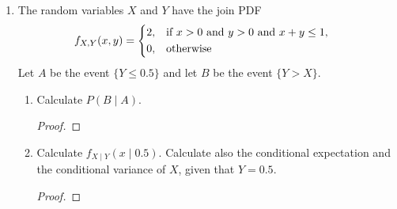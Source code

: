 \documentclass[paper=usletter, fontsize=12pt]{article}
\begin{document}
\begin{enumerate}
\begin{enumerate}
\begin{proof}
            \end{proof}

            \item On a given day your driving time was 45 minutes. What is the
            probability that this particular day was rainy?
            \begin{proof}

                \begin{align*}
                    P(\text{rainy} \mid X=45) & = \frac{P(\text{rainy})f(X=45 \mid \text{rainy})}{f(X=45)}\\
                    & = \frac{\frac{1}{3}\times\frac{1}{20}}{\frac{2}{45}+\frac{1}{60}} \\
                    & = \frac{3}{11} \qedhere
                \end{align*}

            \end{proof}

            \item Your distance to work is 20 miles. What is the PDF, the mean,
            and the variance of your average speed (driving distance over
            driving time)?
            \begin{proof}
            \end{proof}

        \end{enumerate}

        \item The random variables $X$ and $Y$ have the join PDF
        \begin{align*}
            f_{X,Y}(x,y) & =
            \begin{dcases}
                2, & \text{if $x > 0$ and $y>0$ and $x+y\le 1$},\\
                0, & \text{otherwise}
            \end{dcases}
        \end{align*}
        Let $A$ be the event $\{Y \le 0.5\}$ and let $B$ be the event
        $\{Y>X\}$.
        \begin{enumerate}

            \item Calculate $P(B \mid A)$.
            \begin{proof}
            \end{proof}

            \item Calculate $f_{X \mid Y}(x \mid 0.5)$. Calculate also the
            conditional expectation and the conditional variance of $X$, given
            that $Y=0.5$.
            \begin{proof}
            \end{proof}


\end{enumerate}
\end{enumerate}
\end{document}
